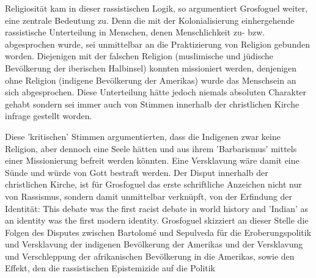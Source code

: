 Religiosität kam in dieser rassistischen Logik, so argumentiert Grosfoguel
weiter, eine zentrale Bedeutung zu. Denn die mit der Kolonialisierung
einhergehende rassistische Unterteilung in Menschen, denen Menschlichkeit zu-
bzw. abgesprochen wurde, sei unmittelbar an die Praktizierung von Religion
gebunden worden. Diejenigen mit der falschen Religion (muslimische und jüdische
Bevölkerung der iberischen Halbinsel) konnten missioniert werden, denjenigen
ohne Religion (indigene Bevölkerung der Amerikas) wurde das Menschsein an sich
abgesprochen.\footnotemark {} 
Diese Unterteilung hätte jedoch niemals absoluten Charakter
gehabt sondern sei immer auch von Stimmen innerhalb der christlichen Kirche
infrage gestellt worden.

Diese 'kritischen' Stimmen argumentierten, dass die Indigenen zwar keine
Religion, aber dennoch eine Seele hätten und aus ihrem 'Barbarismus' mittels
einer Missionierung befreit werden könnten. \footnotemark {}
Eine Versklavung wäre damit eine
Sünde und würde von Gott bestraft werden. Der Disput innerhalb der christlichen
Kirche, ist für Grosfoguel das erste schriftliche Anzeichen nicht nur von
Rassismus, sondern damit unmittelbar verknüpft, von der Erfindung der
Identität: \glqq This debate was the first racist debate in world history and
'Indian' as an identity was the first modern identity. \grqq \footnotemark
{} Grosfoguel skizziert an dieser Stelle
die Folgen des Disputes zwischen Bartolomé und Sepulveda für die
Eroberungspolitik und Versklavung der indigenen Bevölkerung der Amerikas und
der Versklavung und Verschleppung der afrikanischen Bevölkerung in die
Amerikas, sowie den Effekt, den die rassistischen Epistemizide auf die Politik
